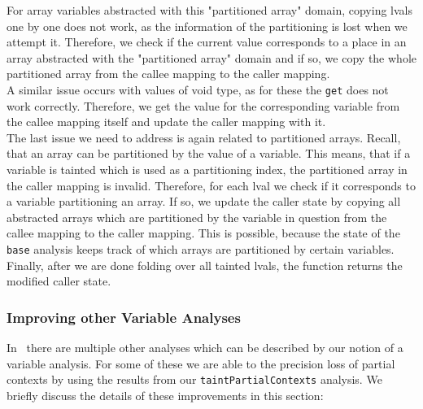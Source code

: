       For array variables abstracted with this "partitioned array" domain, copying \ac{lval}s one by one does not work, as the information of the partitioning is lost when we attempt it. Therefore, we check if the current value corresponds to a place in an array abstracted with the "partitioned array" domain and if so, we copy the whole partitioned array from the callee mapping to the caller mapping.\\
      A similar issue occurs with values of void type, as for these the \texttt{get} does not work correctly. Therefore, we get the value for the corresponding variable from the callee mapping itself and update the caller mapping with it.\\
      The last issue we need to address is again related to partitioned arrays. Recall, that an array can be partitioned by the value of a variable. This means, that if a variable is tainted which is used as a partitioning index, the partitioned array in the caller mapping is invalid. Therefore, for each \ac{lval} we check if it corresponds to a variable partitioning an array. If so, we update the caller state by copying all abstracted arrays which are partitioned by the variable in question from the callee mapping to the caller mapping. This is possible, because the state of the \texttt{base} analysis keeps track of which arrays are partitioned by certain variables.\\
      Finally, after we are done folding over all tainted \ac{lval}s, the function returns the modified caller state.

    \subsubsection{Improving other Variable Analyses}
      In \gob\ there are multiple other analyses which can be described by our notion of a variable analysis. For some of these we are able to the precision loss of partial contexts by using the results from our \texttt{taintPartialContexts} analysis. We briefly discuss the details of these improvements in this section:

